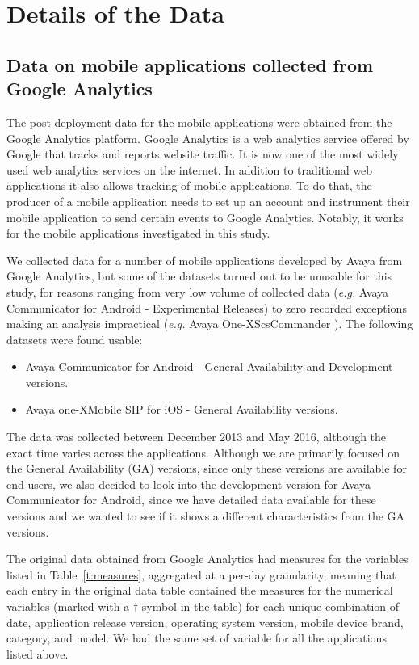 \documentclass[smallextended]{svjour3}       %
\begin{document}
\section{Details of the Data}\label{s:data}

\subsection{Data on mobile applications collected from Google Analytics}
The post-deployment data for the mobile applications were obtained from the 
Google Analytics platform.
Google Analytics is a web analytics service offered by
Google that tracks and reports website traffic. It is now one of the most
widely used web analytics services on the internet. In addition to
traditional web applications it also allows tracking of mobile
applications. To do that, the producer of a mobile application needs
to set up an account and instrument their mobile application to send certain
events to Google Analytics. Notably, it works for the mobile
applications investigated in this study. 

We collected data for a number of mobile applications developed by Avaya from Google Analytics, but some of the datasets turned out to be unusable for this study, for reasons ranging from very low volume of collected data (\textit{e.g.} Avaya Communicator for Android - Experimental Releases) to zero recorded exceptions making an analysis impractical (\textit{e.g.} Avaya One-X\textregistered   ScsCommander ). The following datasets were found usable:
\begin{itemize}
    \item Avaya Communicator for Android - General Availability and Development versions.
    \item Avaya one-X\textregistered Mobile  SIP  for  iOS - General Availability versions.
\end{itemize}

The data was collected between December 2013 and May 2016, although the exact time varies across the applications. Although we are primarily focused on the General Availability (GA) versions, since only these versions are available for end-users, we also decided to look into the development version for Avaya Communicator for Android, since we have detailed data available for these versions and we wanted to see if it shows a different characteristics from the GA versions.  

The original data obtained from Google Analytics had measures for the variables 
listed in Table~\ref{t:measures}, aggregated at a per-day granularity, meaning 
that each entry in the original data table contained the measures for the numerical 
variables (marked with a $\dagger$ symbol in the table) for each unique combination
of date, application release version, operating system version, mobile device brand, 
category, and model. We had the same set of variable for all the applications listed above.
\end{document}
